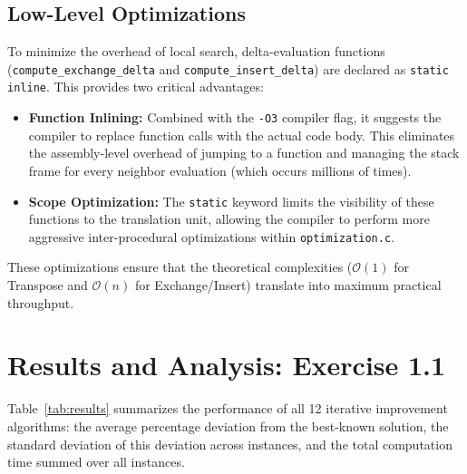 \documentclass[11pt, a4paper]{article}
\begin{document}
\subsection{Low-Level Optimizations}

To minimize the overhead of local search, delta-evaluation functions (\texttt{compute\_exchange\_delta} and \texttt{compute\_insert\_delta}) are declared as \texttt{static inline}. This provides two critical advantages:
\begin{itemize}
    \item \textbf{Function Inlining:} Combined with the \texttt{-O3} compiler flag, it suggests the compiler to replace function calls with the actual code body. This eliminates the assembly-level overhead of jumping to a function and managing the stack frame for every neighbor evaluation (which occurs millions of times).
    \item \textbf{Scope Optimization:} The \texttt{static} keyword limits the visibility of these functions to the translation unit, allowing the compiler to perform more aggressive inter-procedural optimizations within \texttt{optimization.c}.
\end{itemize}
These optimizations ensure that the theoretical complexities ($\mathcal{O}(1)$ for Transpose and $\mathcal{O}(n)$ for Exchange/Insert) translate into maximum practical throughput.

\section{Results and Analysis: Exercise 1.1}
\label{sec:results11}

Table~\ref{tab:results} summarizes the performance of all 12 iterative improvement algorithms: the average percentage deviation from the best-known solution, the standard deviation of this deviation across instances, and the total computation time summed over all instances.
\end{document}
